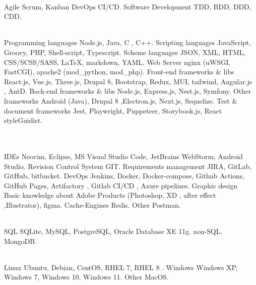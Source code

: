 


\begin{cvskills}

  \\

  \cvskill
    {Agile}
    {Scrum, Kanban}
  \cvskill
    {DevOps}
    {CI/CD.}
  \cvskill
    {Software Development}
    {TDD, BDD, DDD, CDD.}

  \\

  \cvskill
    {Programming languages}
    {Node.js, Java, C , C++.}
  \cvskill
    {Scripting languages}
    {JavaScript, Groovy, PHP, Shell-script, Typescript.}
  \cvskill
    {Scheme languages}
    {JSON, XML, HTML, CSS/SCSS/SASS, LaTeX, markdown, YAML.}
  \cvskill
    {Web Server}
    {nginx (uWSGI, FastCGI), apache2 (mod\_python, mod\_php).}
  \cvskill
    {Front-end frameworks \& libs}
    {React.js, Vue.js, Three.js, Drupal 8, Bootstrap, Redux, MUI, tailwind, Angular.js , AntD.}
  \cvskill
    {Back-end frameworks \& libs}
    {Node.js, Express.js, Nest.js, Symfony.}
  \cvskill
    {Other frameworks}
    {Android (Java), Drupal 8 ,Electron.js, Next.js, Sequelize.}
  \cvskill
    {Test \& document frameworks}
    {Jest, Playwright, Puppeteer, Storybook.js, React styleGuidist.}

  \\
  \\

    \cvskill
      {IDEs}
      {Neovim, Eclipse, MS Visual Studio Code, JetBrains WebStorm, Android Studio.}
    \cvskill
      {Revision Control System}
      {GIT.}
    \cvskill
      {Requirements management}
      {JIRA, GitLab, GitHub, bitbucket.}
    \cvskill
      {DevOps}
      {Jenkins, Docker, Docker-compose, Github Actions, GitHub Pages, Artifactory , Gitlab CI/CD , Azure
       \newline pipelines.}
    \cvskill
      {Graphic design}
      {Basic knowledge about Adobe Products (Photoshop, XD , after effect ,Illustrator), figma.}
    \cvskill
      {Cache-Engines}
      {Redis.}
    \cvskill
      {Other}
      {Postman.}

  \\

    \cvskill
        {SQL}
        {SQLite, MySQL, PostgreSQL, Oracle Database XE 11g.}
    \cvskill
        {non-SQL.}
        {MongoDB.}

  \\

    \cvskill
        {Linux}
        {Ubuntu, Debian, CentOS, RHEL 7, RHEL 8 .}
    \cvskill
        {Windows}
        {Windows XP, Windows 7, Windows 10, Windows 11.}
    \cvskill
        {Other}
        {MacOS.}
\end{cvskills}
